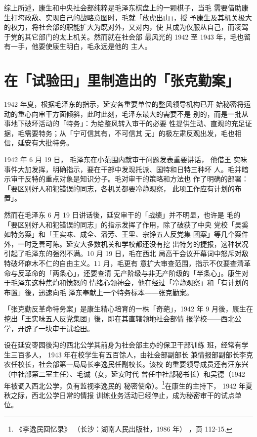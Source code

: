 综上所述，康生和中央社会部纯粹是毛泽东棋盘上的一颗棋子，当毛
需要借助康生打垮政敌、实现自己的战略意图时，毛就「放虎出山」，授
予康生及其机关极大的权力，将社会部的职能扩大为既对外，又对内，使
其成为仅服从自己，而凌驾于党的其它部门的太上机关。然而就在社会部
最风光的 1942 至 1943 年，毛也留有一手，他要使康生明白，毛永远是他的
主人。

\section{在「试验田」里制造出的「张克勤案」}
1942 年夏，根据毛泽东的指示，延安各重要单位的整风领导机构已开
始秘密将运动的重心向审干方面倾斜，此时此刻，毛泽东最大的需要不是
别的，而是一批从事地下破坏活动的「特务」：为给整风转入审干的必要
性提供生动、直观的充足证据，毛需要特务；从「宁可信其有，不可信其
无」的极左肃反观出发，毛也相信，延安有大批特务。

1942 年 6 月 19 日，
毛泽东在小范围内就审干问题发表重要讲话，
他借王
实味事件大加发挥，明确指示，要在干部中发现托派、国特和日特三种坏
人。毛并暗示审干反特的重点对象是知识分子。毛对审干的策略和方法也
作了明确的部署：「要区别好人和犯错误的同志，各机关都要冷静观察，
此项工作应有计划的布置」。

然而在毛泽东 6 月 19 日讲话後，延安审干的「战绩」并不明显，也许是
毛的「要区别好人和犯错误的同志」的指示发挥了作用，除了破获了中央
党校「吴奚如特务案」和「王实味、成全、潘芳、王里、宗铮五人反党集
团案」等几个案件外，一时乏善可陈。延安大多数机关和学校都还没有挖
出特务的捷报，这种状况引起了毛泽东的强烈不满。10 月 19 日，毛在西北
局高干会议开幕词中怒斥对敌特破坏麻木不仁的自由主义。11 月，毛更有
意扩大审查范围，指示不仅要查清革命与反革命的「两条心」，还要查清
无产阶级与非无产阶级的「半条心」。康生对于毛泽东这种焦灼和愤怒的
情绪心领神会，他在经过「冷静观察」和「有计划的布置」後，迅速向毛
泽东奉献上一个特务标本——张克勤案。

「张克勤反革命特务案」是康生精心培育的一株「奇葩」，1942 年 9
月後，康生在挖出「王实味五人反党集团」後，即在其直辖领地社会部情
报学校——西北公学，开辟了一块审干试验田。

设在延安枣园後沟的西北公学其前身为社会部主办的保卫干部训练
班，经常有学生三百多人， 1943 年在校学生有五百馀人，由社会部副部长
兼情报部副部长李克农任校长，社会部第一局局长李逸民任副校长。该校
的重要领导成员还有汪东兴（中社部第二室主任）、毛诚（女，延安时代
曾任中社部秘书长）和吴德（1942 年被调入西北公学，负有监视李逸民的
秘密使命）。\footnote{《李逸民回忆录》
（长沙：湖南人民出版社，1986 年）
，页 112-15.}在康生的主持下， 1942 年夏秋之际，西北公学日常的情报
训练业务活动已经停止，成为秘密审干的试点单位。

